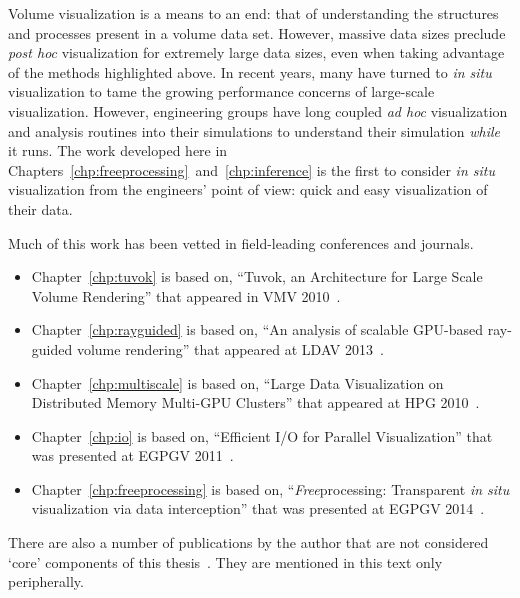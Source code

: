 Volume visualization is a means to an end: that of understanding the
structures and processes present in a volume data set.  However,
massive data
sizes preclude \textit{post hoc} visualization for extremely large data
sizes, even when taking advantage of the methods highlighted above.  In
recent
years, many have turned to \textit{in situ} visualization to tame the
growing performance concerns of large-scale visualization.  However,
engineering groups have long coupled \textit{ad hoc} visualization and
analysis routines into their simulations to understand their simulation
\emph{while} it runs.  The work developed here in
Chapters~\ref{chp:freeprocessing}~and~\ref{chp:inference} is the first
to consider
\textit{in situ} visualization from the engineers' point of view: quick
and easy visualization of their data.

Much of this work has been vetted in field-leading conferences and
journals.
\begin{itemize}

  \item Chapter~\ref{chp:tuvok} is based on, ``Tuvok, an
  Architecture for Large Scale Volume Rendering'' that appeared in VMV
  2010~\cite{Fogal:2010:Tuvok}.

	\item Chapter~\ref{chp:rayguided} is based on, ``An analysis of scalable
	GPU-based ray-guided volume rendering'' that appeared at LDAV
	2013~\cite{Fogal:2013:Analysis}.

  \item Chapter~\ref{chp:multiscale} is based on, ``Large Data
  Visualization on Distributed Memory Multi-GPU Clusters'' that
  appeared at HPG 2010~\cite{Fogal:2010:HPG}.

  \item Chapter~\ref{chp:io} is based on, ``Efficient I/O
  for Parallel Visualization'' that was presented at EGPGV
  2011~\cite{Fogal:2011:PracticalIO}.

	\item Chapter~\ref{chp:freeprocessing} is based on,
	``\textit{Free}processing: Transparent \textit{in situ} visualization via
	data interception'' that was presented at EGPGV
	2014~\cite{Fogal:2014:Freeprocessing}.

\end{itemize}

There are also a number of publications by the author that are not
considered
`core' components of this thesis~\cite{Fogal:2009:SizeMatters,
Fogal:2010:Bridge, Jevremovic:2011:Education, Jovana:2012:Interactive,
Brownlee:2012:GLuRay, Childs:2012:VisIt, Hermilo:2013:Steering,
Butson:2013:DBS}.  They are mentioned in this text only peripherally.


